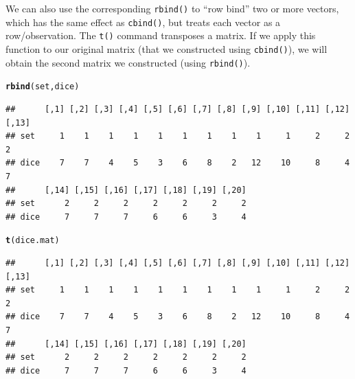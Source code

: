 \documentclass[12pt]{article}\usepackage[]{graphicx}\usepackage[]{color}
\makeatletter
\newcommand{\hlstd}[1]{\textcolor[rgb]{0.345,0.345,0.345}{#1}}%
\newcommand{\hlkwd}[1]{\textcolor[rgb]{0.737,0.353,0.396}{\textbf{#1}}}%
\newenvironment{kframe}{%
 \def\at@end@of@kframe{}%
 \ifinner\ifhmode%
  \def\at@end@of@kframe{\end{minipage}}%
  \begin{minipage}{\columnwidth}%
 \fi\fi%
 \def\FrameCommand##1{\hskip\@totalleftmargin \hskip-\fboxsep
 \colorbox{shadecolor}{##1}\hskip-\fboxsep
     \hskip-\linewidth \hskip-\@totalleftmargin \hskip\columnwidth}%
 \MakeFramed {\advance\hsize-\width
   \@totalleftmargin\z@ \linewidth\hsize
   \@setminipage}}%
 {\par\unskip\endMakeFramed%
 \at@end@of@kframe}
\newenvironment{knitrout}{}{} %
\makeatother
\begin{document}
We can also use the corresponding \verb|rbind()| to ``row bind'' two or more vectors, which has the same effect as \verb|cbind()|, but treats each vector as a row/observation. The \verb|t()| command transposes a matrix. If we apply this function to our original matrix (that we constructed using \verb|cbind()|), we will obtain the second matrix we constructed (using \verb|rbind()|).
\begin{knitrout}
\color{fgcolor}\begin{kframe}
\begin{alltt}
\hlkwd{rbind}\hlstd{(set, dice)}
\end{alltt}
\begin{verbatim}
##      [,1] [,2] [,3] [,4] [,5] [,6] [,7] [,8] [,9] [,10] [,11] [,12] [,13]
## set     1    1    1    1    1    1    1    1    1     1     2     2     2
## dice    7    7    4    5    3    6    8    2   12    10     8     4     7
##      [,14] [,15] [,16] [,17] [,18] [,19] [,20]
## set      2     2     2     2     2     2     2
## dice     7     7     7     6     6     3     4
\end{verbatim}
\begin{alltt}
\hlkwd{t}\hlstd{(dice.mat)}
\end{alltt}
\begin{verbatim}
##      [,1] [,2] [,3] [,4] [,5] [,6] [,7] [,8] [,9] [,10] [,11] [,12] [,13]
## set     1    1    1    1    1    1    1    1    1     1     2     2     2
## dice    7    7    4    5    3    6    8    2   12    10     8     4     7
##      [,14] [,15] [,16] [,17] [,18] [,19] [,20]
## set      2     2     2     2     2     2     2
## dice     7     7     7     6     6     3     4
\end{verbatim}
\end{kframe}
\end{knitrout}
\end{document}

